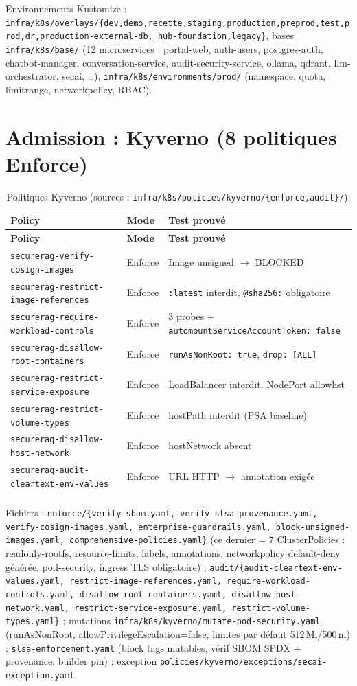 \documentclass[12pt,a4paper,openany]{report}
\begin{document}
Environnements Kustomize : \texttt{infra/k8s/overlays/\{dev,demo,recette,staging,production,preprod,test,prod,dr,production-external-db,\_hub-foundation,legacy\}},
bases \texttt{infra/k8s/base/} (12 microservices : portal-web, auth-users, postgres-auth,
chatbot-manager, conversation-service, audit-security-service, ollama, qdrant,
llm-orchestrator, secai, \dots), \texttt{infra/k8s/environments/prod/}
(namespace, quota, limitrange, networkpolicy, RBAC).

\section{Admission : Kyverno (8 politiques Enforce)}

\begin{longtable}{@{}lll@{}}
\toprule
\textbf{Policy} & \textbf{Mode} & \textbf{Test prouvé} \\
\midrule
\endfirsthead
\toprule
\textbf{Policy} & \textbf{Mode} & \textbf{Test prouvé} \\
\midrule
\endhead
\texttt{securerag-verify-cosign-images} & Enforce & Image unsigned $\rightarrow$ BLOCKED \\
\texttt{securerag-restrict-image-references} & Enforce & \texttt{:latest} interdit, \texttt{@sha256:} obligatoire \\
\texttt{securerag-require-workload-controls} & Enforce & 3 probes + \texttt{automountServiceAccountToken: false} \\
\texttt{securerag-disallow-root-containers} & Enforce & \texttt{runAsNonRoot: true}, \texttt{drop: [ALL]} \\
\texttt{securerag-restrict-service-exposure} & Enforce & LoadBalancer interdit, NodePort allowlist \\
\texttt{securerag-restrict-volume-types} & Enforce & hostPath interdit (PSA baseline) \\
\texttt{securerag-disallow-host-network} & Enforce & hostNetwork absent \\
\texttt{securerag-audit-cleartext-env-values} & Enforce & URL HTTP $\rightarrow$ annotation exigée \\
\bottomrule
\caption{Politiques Kyverno (sources : \texttt{infra/k8s/policies/kyverno/\{enforce,audit\}/}).}
\label{tab:kyverno}
\end{longtable}

Fichiers : \texttt{enforce/\{verify-sbom.yaml, verify-slsa-provenance.yaml, verify-cosign-images.yaml,
enterprise-guardrails.yaml, block-unsigned-images.yaml, comprehensive-policies.yaml\}}
(ce dernier = 7 ClusterPolicies : readonly-rootfs, resource-limits, labels, annotations,
networkpolicy default-deny générée, pod-security, ingress TLS obligatoire) ;
\texttt{audit/\{audit-cleartext-env-values.yaml, restrict-image-references.yaml,
require-workload-controls.yaml, disallow-root-containers.yaml, disallow-host-network.yaml,
restrict-service-exposure.yaml, restrict-volume-types.yaml\}} ;
mutations \texttt{infra/k8s/kyverno/mutate-pod-security.yaml}
(runAsNonRoot, allowPrivilegeEscalation=false, limites par défaut 512\,Mi/500\,m) ;
\texttt{slsa-enforcement.yaml} (block tags mutables, vérif SBOM SPDX + provenance, builder pin) ;
exception \texttt{policies/kyverno/exceptions/secai-exception.yaml}.
\end{document}
